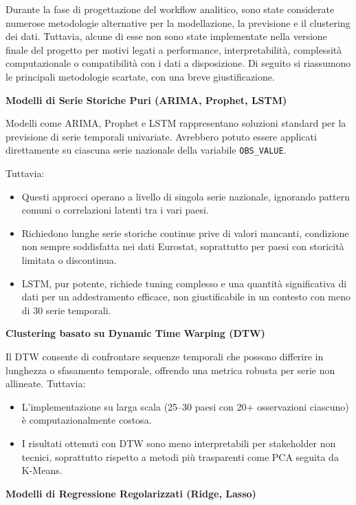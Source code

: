\documentclass[conference]{IEEEtran}
\begin{document}
\begin{itemize}
{Durante la fase di progettazione del workflow analitico, sono state considerate numerose metodologie alternative per la modellazione, la previsione e il clustering dei dati. Tuttavia, alcune di esse non sono state implementate nella versione finale del progetto per motivi legati a performance, interpretabilità, complessità computazionale o compatibilità con i dati a disposizione. Di seguito si riassumono le principali metodologie scartate, con una breve giustificazione.

\noindent\textbf{Modelli di Serie Storiche Puri (ARIMA, Prophet, LSTM)}

Modelli come ARIMA, Prophet e LSTM rappresentano soluzioni standard per la previsione di serie temporali univariate. Avrebbero potuto essere applicati direttamente su ciascuna serie nazionale della variabile \texttt{OBS\_VALUE}.

Tuttavia:
\begin{itemize}
    \item Questi approcci operano a livello di singola serie nazionale, ignorando pattern comuni o correlazioni latenti tra i vari paesi.
    \item Richiedono lunghe serie storiche continue prive di valori mancanti, condizione non sempre soddisfatta nei dati Eurostat, soprattutto per paesi con storicità limitata o discontinua.
    \item LSTM, pur potente, richiede tuning complesso e una quantità significativa di dati per un addestramento efficace, non giustificabile in un contesto con meno di 30 serie temporali.
\end{itemize}

\noindent\textbf{Clustering basato su Dynamic Time Warping (DTW)}

Il DTW consente di confrontare sequenze temporali che possono differire in lunghezza o sfasamento temporale, offrendo una metrica robusta per serie non allineate. Tuttavia:

\begin{itemize}
    \item L’implementazione su larga scala (25–30 paesi con 20+ osservazioni ciascuno) è computazionalmente costosa.
    \item I risultati ottenuti con DTW sono meno interpretabili per stakeholder non tecnici, soprattutto rispetto a metodi più trasparenti come PCA seguita da K-Means.
\end{itemize}

\noindent\textbf{Modelli di Regressione Regolarizzati (Ridge, Lasso)}

}
\end{itemize}
\end{document}
